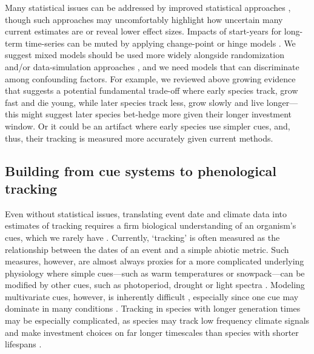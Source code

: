 \documentclass[11pt,letterpaper]{article}
\begin{document}
Many statistical issues can be addressed by improved statistical approaches \citep[e.g.,][]{gienapp2005,pearse2017}, though such approaches may uncomfortably highlight how uncertain many current estimates are \citep{brown2016} or reveal lower effect sizes. Impacts of start-years for long-term time-series can be muted by applying change-point or hinge models \citep[e.g.,][]{kharouba2018}.  We suggest mixed models should be used more widely alongside randomization and/or data-simulation approaches \citep[e.g.,][]{bolmgren2013}, and we need models that can discriminate among confounding factors. For example, we reviewed above growing evidence that suggests a potential fundamental trade-off where early species track, grow fast and die young, while later species track less, grow slowly and live longer---this might suggest later species bet-hedge more given their longer investment window. Or it could be an artifact where early species use simpler cues, and, thus, their tracking is measured more accurately given current methods. 

\subsection{Building from cue systems to phenological tracking} 
Even without statistical issues, translating event date and climate data into estimates of tracking requires a firm biological understanding of an organism's cues, which we rarely have \citep{chmura2019}. Currently, `tracking' is often measured as the relationship between the dates of an event and a simple abiotic metric. Such measures, however, are almost always proxies for a more complicated underlying physiology where simple cues---such as warm temperatures or snowpack---can be modified by other cues, such as photoperiod, drought or light spectra \citep{Bagnall1993,Stinchcombe:2004ec}. Modeling multivariate cues, however, is inherently difficult \citep{chuine2016}, especially since one cue may dominate in many conditions \citep[and potentially lead many phenological models to fail spectacularly in the future, see][]{chuine2016}. Tracking in species with longer generation times may be especially complicated, as species may track low frequency climate signals and make investment choices on far longer timescales than species with shorter lifespans \citep{morris2008}. 
\end{document}
